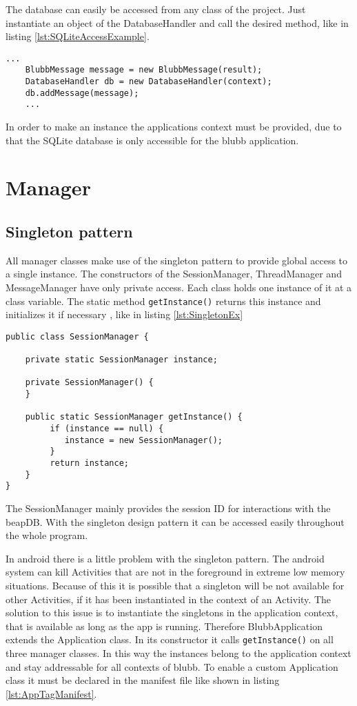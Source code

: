 \documentclass[12pt,a4paper,oneside]{report}
\newcommand{\appname}{blubb}
\newcommand{\beapDB}{beapDB}
\newcommand{\code}[1]{\lstinline{#1}}
\begin{document}
The database can easily be accessed from any class of the project. Just instantiate an object of the DatabaseHandler and call the desired method, like in listing \ref{lst:SQLiteAccessExample}. 
\begin{lstlisting}[caption=Accessing the SQLite database, label=lst:SQLiteAccessExample]
	...
	BlubbMessage message = new BlubbMessage(result);
	DatabaseHandler db = new DatabaseHandler(context);
	db.addMessage(message);
	...
\end{lstlisting}
In order to make an instance the applications context must be provided, due to that the SQLite database is only accessible for the \appname{} application.

\section{Manager}

\subsection{Singleton pattern}
All manager classes make use of the singleton pattern to provide global access to a single instance. The constructors of the SessionManager, ThreadManager and MessageManager have only private access. Each class holds one instance of it at a class variable. The static method \code{getInstance()} returns this instance and initializes it if necessary \citep{cooper2000java}, like in listing \ref{lst:SingletonEx}

\begin{lstlisting}[caption=Example for the singleton pattern, label=lst:SingletonEx]
public class SessionManager {

	private static SessionManager instance;
	
	private SessionManager() {
	}
	
	public static SessionManager getInstance() {
		 if (instance == null) {
		 	instance = new SessionManager();
		 }
		 return instance;
	}
}

\end{lstlisting}

The SessionManager mainly provides the session ID for interactions with the \beapDB{}. With the singleton design pattern it can be accessed easily throughout the whole program. 


In android there is a little problem with the singleton pattern.
The android system can kill Activities that are not in the foreground in extreme low memory situations. Because of this it is possible that a singleton will be not available for other Activities, if it has been instantiated in the context of an Activity. 
The solution to this issue is to instantiate the singletons in the application context, that is available as long as the app is running. Therefore BlubbApplication extends the Application class. In its constructor it calls \code{getInstance()} on all three manager classes. In this way the instances belong to the application context and stay addressable for all contexts of \appname{}.
To enable a custom Application class it must be declared in the manifest file like shown in listing \ref{lst:AppTagManifest}.
\end{document}
